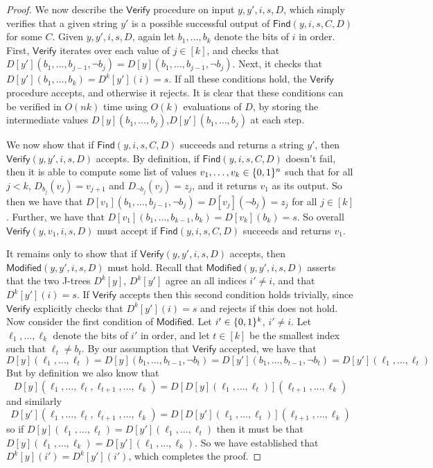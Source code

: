 \begin{proof}
\sloppy We now describe the $\mathsf{Verify}$ procedure on input $y,y',i,s,D$, which simply verifies that a given string $y'$ is a possible successful output of $\mathsf{Find}(y,i,s,C,D)$ for some $C$. Given $y,y',i,s,D$, again let $b_1,\ldots, b_k$ denote the bits of $i$ in order. First, $\mathsf{Verify}$ iterates over each value of $j \in [k]$, and checks that $D[y'](b_1,\ldots,b_{j-1},\lnot b_j) = D[y](b_1,\ldots,b_{j-1},\lnot b_j)$. Next, it checks that $D[y'](b_1,\ldots,b_k) = D^k[y'](i) = s$. If all these conditions hold, the $\mathsf{Verify}$ procedure accepts, and otherwise it rejects. It is clear that these conditions can be verified in $O(nk)$ time using $O(k)$ evaluations of $D$, by storing the intermediate values $D[y](b_1,\ldots,b_j)$,$D[y'](b_1,\ldots,b_j)$ at each step.

We now show that if $\mathsf{Find}(y,i,s,C,D)$ succeeds and returns a string $y'$, then $\mathsf{Verify}(y,y',i,s,D)$ accepts. By definition, if $\mathsf{Find}(y,i,s,C,D)$ doesn't fail, then it is able to compute some list of values $v_1,\ldots,v_k \in \{0,1\}^n$ such that for all $j < k$, $D_{b_j}(v_j) = v_{j+1}$ and $D_{\lnot b_j}(v_j) = z_j$, and it returns $v_1$ as its output. So then we have that $D[v_1](b_1,\ldots,b_{j-1},\lnot b_j) = D[v_j](\lnot b_j) = z_j$ for all $j \in [k]$. Further, we have that $D[v_1](b_1,\ldots,b_{k-1},b_k) = D[v_k](b_k) = s$. So overall $\mathsf{Verify}(y,v_1,i,s,D)$ must accept if $\mathsf{Find}(y,i,s,C,D)$ succeeds and returns $v_1$.

It remains only to show that if $\mathsf{Verify}(y,y',i,s,D)$ accepts, then $\mathsf{Modified}(y,y',i,s,D)$ must hold. Recall that $\mathsf{Modified}(y,y',i,s,D)$ asserts that the two J-trees $D^k[y]$, $D^k[y']$ agree an all indices $i'\neq i$, and that $D^k[y'](i) = s$. If $\mathsf{Verify}$ accepts then this second condition holds trivially, since $\mathsf{Verify}$ explicitly checks that $D^k[y'](i) = s$ and rejects if this does not hold. Now consider the first condition of $\mathsf{Modified}$. Let $i' \in \{0,1\}^k$, $i' \neq i$. Let $\ell_1, \ldots, \ell_k$ denote the bits of $i'$ in order, and let $t \in [k]$ be the smallest index such that $\ell_t \neq b_t$. By our assumption that $\mathsf{Verify}$ accepted, we have that 
\[
D[y](\ell_1,\ldots,\ell_t) = D[y](b_1,\ldots,b_{t-1},\lnot b_t) = D[y'](b_1,\ldots,b_{t-1},\lnot b_t) = D[y'](\ell_1,\ldots,\ell_t)
\]
But by definition we also know that
\[
D[y](\ell_1,\ldots,\ell_t,\ell_{t+1},\ldots,\ell_k) = D[D[y](\ell_1,\ldots,\ell_t)](\ell_{t+1},\ldots,\ell_k)
\]
and similarly
\[
D[y'](\ell_1,\ldots,\ell_t,\ell_{t+1},\ldots,\ell_k) = D[D[y'](\ell_1,\ldots,\ell_t)](\ell_{t+1},\ldots,\ell_k)
\]
so if $D[y](\ell_1,\ldots,\ell_t) = D[y'](\ell_1,\ldots,\ell_t)$ then it must be that $D[y](\ell_1,\ldots,\ell_k) = D[y'](\ell_1,\ldots,\ell_k)$. So we have established that $D^k[y](i') = D^k[y'](i')$, which completes the proof.
\end{proof}

